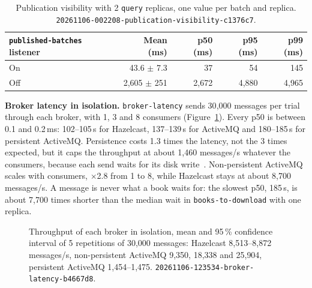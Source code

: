 \documentclass[11pt,a4paper]{article}
\newcommand{\code}[1]{\nolinkurl{#1}}
\newcommand{\run}[1]{\nolinkurl{#1}}
\begin{document}
\begin{table}[ht]
\centering
\small
\caption{Publication visibility with 2 \code{query} replicas, one value per batch and replica.
\run{20261106-002208-publication-visibility-c1376c7}.}
\label{tab:visibility}
\begin{tabular}{@{}lrrrr@{}}
\toprule
\code{published-batches} listener & Mean (ms) & p50 (ms) & p95 (ms) & p99 (ms) \\
\midrule
On & 43.6 $\pm$ 7.3 & 37 & 54 & 145 \\
Off & 2{,}605 $\pm$ 251 & 2{,}672 & 4{,}880 & 4{,}965 \\
\bottomrule
\end{tabular}
\end{table}

\textbf{Broker latency in isolation.} \code{broker-latency} sends 30{,}000 messages per trial through each broker, with
1, 3 and 8 consumers (Figure~\ref{fig:broker}). Every p50 is between 0.1 and 0.2\,ms: 102--105\,\textmu s for Hazelcast,
137--139\,\textmu s for ActiveMQ and 180--185\,\textmu s for persistent ActiveMQ. Persistence costs 1.3 times the latency,
not the 3 times expected, but it caps the throughput at about 1{,}460 messages/s whatever the consumers, because each
send waits for its disk write~\cite{activemq}. Non-persistent ActiveMQ scales with consumers, $\times$2.8 from 1 to 8, while Hazelcast
stays at about 8{,}700 messages/s. A message is never what a book waits for: the slowest p50, 185\,\textmu s, is about
7{,}700 times shorter than the median wait in \code{books-to-download} with one replica.

\begin{figure}[ht]
\centering
{}
\caption{Throughput of each broker in isolation, mean and 95\,\% confidence interval of 5 repetitions of 30{,}000
messages: Hazelcast 8{,}513--8{,}872 messages/s, non-persistent ActiveMQ 9{,}350, 18{,}338 and 25{,}904, persistent
ActiveMQ 1{,}454--1{,}475. \run{20261106-123534-broker-latency-b4667d8}.}
\label{fig:broker}
\end{figure}
\end{document}
